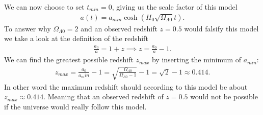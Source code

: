 \documentclass{emulateapj}
\begin{document}
	We can now choose to set $t_{min} = 0$, giving us the scale factor of this model
	\begin{align*}
		a(t) = a_{min}\cosh(H_0\sqrt{\Omega_{\Lambda 0}}t).
	\end{align*}
	To answer why $\Omega_{\Lambda 0} = 2$ and an observed redshift $z=0.5$ would falsify this model we take a look at the definition of the redshift
	\begin{align}
		\frac{a_0}{a} = 1 + z\implies z = \frac{a_0}{a} - 1.
	\end{align}
	We can find the greatest possible redshift $z_{max}$ by inserting the minimum of $a_{min}$:
	\begin{align*}
		z_{max} = \frac{a_0}{a_min} - 1 = \sqrt{\frac{\Omega_{\Lambda 0}}{\Omega_{\Lambda 0} - 1}} - 1 = \sqrt{2} - 1 \approx 0.414.
	\end{align*}
	In other word the maximum redshift should according to this model be about $z_{max}\approx0.414$. Meaning that an observed redshift of $z=0.5$ would not be possible if the universe would really follow this model.
		 
\end{document}
